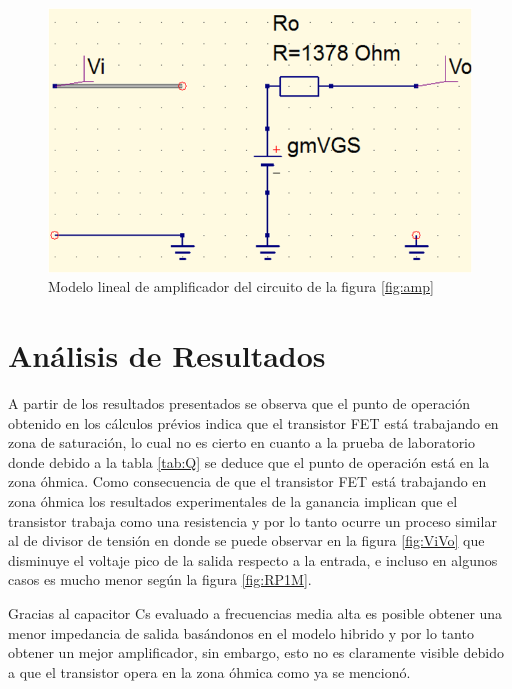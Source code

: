 \documentclass[12pt, a4paper]{article}
\begin{document}
    \begin{figure}[h!]
        \centering
        \includegraphics[height=6cm\textwidth]{modelo.png}
        \caption{Modelo lineal de amplificador del circuito de la figura \ref{fig:amp}}
        \label{fig:mod}
    \end{figure}

    \newpage

    \section{Análisis de Resultados}

    A partir de los resultados presentados se observa que el punto de operación obtenido en los cálculos prévios indica que el transistor FET está trabajando en zona de saturación, lo cual no es cierto en cuanto a la prueba de laboratorio donde debido a la tabla \ref{tab:Q} se deduce que el punto de operación está en la zona óhmica. Como consecuencia de que el transistor FET está trabajando en zona óhmica los resultados experimentales de la ganancia implican que el transistor trabaja como una resistencia y por lo tanto ocurre un proceso similar al de divisor de tensión en donde se puede observar en la figura \ref{fig:ViVo} que disminuye el voltaje pico de la salida respecto a la entrada, e incluso en algunos casos es mucho menor según la figura \ref{fig:RP1M}.

    Gracias al capacitor Cs evaluado a frecuencias media alta es posible obtener una menor impedancia de salida basándonos en el modelo hibrido y por lo tanto obtener un mejor amplificador, sin embargo, esto no es claramente visible debido a que el transistor opera en la zona óhmica como ya se mencionó.
\end{document}
